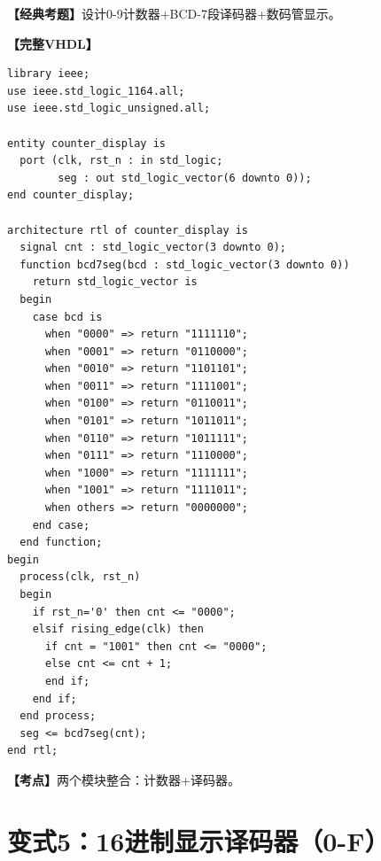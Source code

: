 \begin{detailbox}[完整教学]
\textbf{【经典考题】}设计0-9计数器+BCD-7段译码器+数码管显示。

\textbf{【完整VHDL】}
\begin{lstlisting}
library ieee;
use ieee.std_logic_1164.all;
use ieee.std_logic_unsigned.all;

entity counter_display is
  port (clk, rst_n : in std_logic;
        seg : out std_logic_vector(6 downto 0));
end counter_display;

architecture rtl of counter_display is
  signal cnt : std_logic_vector(3 downto 0);
  function bcd7seg(bcd : std_logic_vector(3 downto 0))
    return std_logic_vector is
  begin
    case bcd is
      when "0000" => return "1111110";
      when "0001" => return "0110000";
      when "0010" => return "1101101";
      when "0011" => return "1111001";
      when "0100" => return "0110011";
      when "0101" => return "1011011";
      when "0110" => return "1011111";
      when "0111" => return "1110000";
      when "1000" => return "1111111";
      when "1001" => return "1111011";
      when others => return "0000000";
    end case;
  end function;
begin
  process(clk, rst_n)
  begin
    if rst_n='0' then cnt <= "0000";
    elsif rising_edge(clk) then
      if cnt = "1001" then cnt <= "0000";
      else cnt <= cnt + 1;
      end if;
    end if;
  end process;
  seg <= bcd7seg(cnt);
end rtl;
\end{lstlisting}

\textbf{【考点】}两个模块整合：计数器+译码器。
\end{detailbox}


\section{变式5：16进制显示译码器（0-F）}

